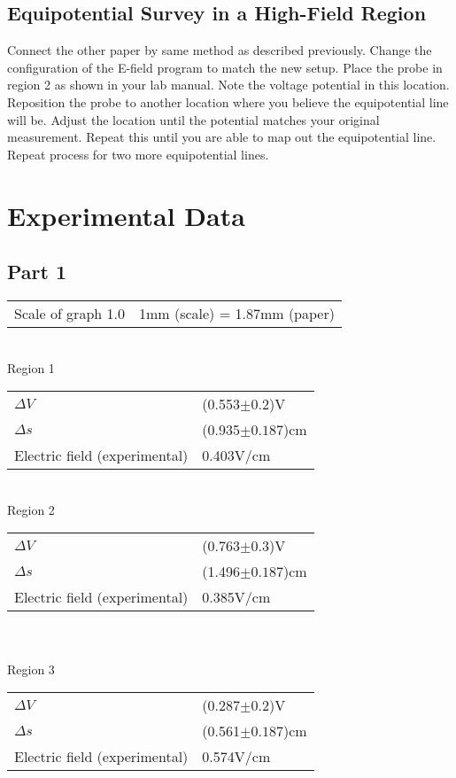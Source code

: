 \documentclass{article}
\begin{document}
\subsection{Equipotential Survey in a High-Field Region}
Connect the other paper by same method as described previously. Change the configuration of the E-field program to match the new setup. Place the probe in region 2 as shown in your lab manual. Note the voltage potential in this location. Reposition the probe to another location where you believe the equipotential line will be. Adjust the location until the potential matches your original measurement. Repeat this until you are able to map out the equipotential line. Repeat process for two more equipotential lines. 

\section{Experimental Data}
\subsection{Part 1}
\begin{tabular}{ll}
Scale of graph 1.0 & 1mm (scale) = 1.87mm (paper)\\
\end{tabular}\\

Region 1\\
\begin{tabular}{ll}
$\Delta V$& (0.553$\pm0.2$)V\\
$\Delta s$& (0.935$\pm0.187$)cm\\
Electric field (experimental) & 0.403V/cm\\
\end{tabular}\\

Region 2\\
\begin{tabular}{ll}
$\Delta V$& (0.763$\pm0.3$)V\\
$\Delta s$& (1.496$\pm0.187$)cm\\
Electric field (experimental) & 0.385V/cm\\
\end{tabular}\\\\

Region 3\\
\begin{tabular}{ll}
$\Delta V$& (0.287$\pm0.2$)V\\
$\Delta s$ & (0.561$\pm0.187$)cm\\
Electric field (experimental) & 0.574V/cm\\
\end{tabular}\\
\end{document}
